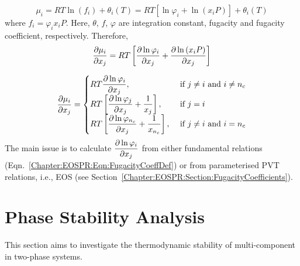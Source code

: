 \begin{equation}
   \mu_{i} = RT\ln\left(f_{i}\right) + \theta_{i}(T) = RT\left[\ln\varphi_{i} + \ln\left(x_{i}P\right)\right] + \theta_{i}(T)
\end{equation}
where $f_{i}=\varphi_{i}x_{i}P$. Here, $\theta$, $f$, $\varphi$ are integration constant, fugacity and fugacity coefficient, respectively. Therefore,
\begin{equation}
   \displaystyle\frac{\partial\mu_{i}}{\partial x_{j}} = RT\left[\displaystyle\frac{\partial\ln\varphi_{i}}{\partial x_{j}} + \displaystyle\frac{\partial\ln\left(x_{i}P\right)}{\partial x_{j}}\right]
\end{equation}

\begin{equation}
  \displaystyle\frac{\partial\mu_{i}}{\partial x_{j}} = 
      \begin{cases}
          RT\displaystyle\frac{\partial\ln\varphi_{i}}{\partial x_{j}}, & \text{ if } j\ne i \text{ and } i\ne n_{c} \\
          RT\left[\displaystyle\frac{\partial\ln\varphi_{j}}{\partial x_{j}} + \displaystyle\frac{1}{x_{j}}\right], & \text{ if } j=i \\
          RT\left[\displaystyle\frac{\partial\ln\varphi_{n_{c}}}{\partial x_{j}} + \displaystyle\frac{1}{x_{n_{c}}}\right], & \text{ if } j\ne i \text{ and } i= n_{c}
      \end{cases}
\end{equation}
The main issue is to calculate $\displaystyle\frac{\partial\ln\varphi_{i}}{\partial x_{j}}$ from either fundamental relations (Eqn.~\ref{Chapter:EOSPR:Eqn:FugacityCoeffDef}) or from parameterised PVT relations, i.e., EOS (see Section~\ref{Chapter:EOSPR:Section:FugacityCoefficients}).

\section{Phase Stability Analysis}\label{Chapter:ThermodynamicFormulation:Section:PhaseStabilityAnalysis}
This section aims to investigate the thermodynamic stability of multi-component in two-phase systems. 


